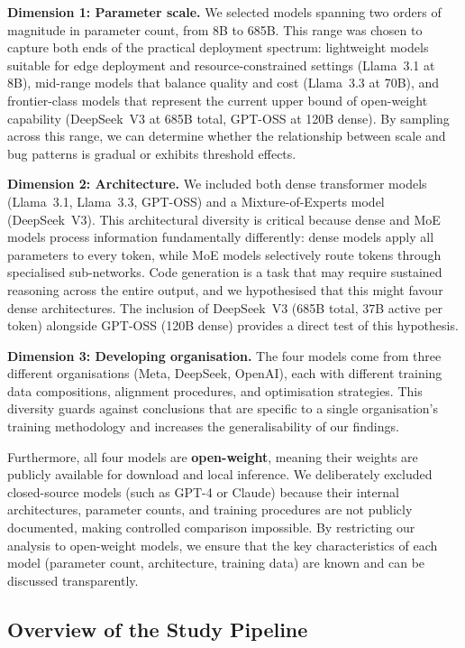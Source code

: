 \documentclass[smallextended]{svjour3}
\begin{document}
\textbf{Dimension 1: Parameter scale.} We selected models spanning two orders of magnitude in parameter count, from 8B to 685B. This range was chosen to capture both ends of the practical deployment spectrum: lightweight models suitable for edge deployment and resource-constrained settings (Llama~3.1 at 8B), mid-range models that balance quality and cost (Llama~3.3 at 70B), and frontier-class models that represent the current upper bound of open-weight capability (DeepSeek~V3 at 685B total, GPT-OSS at 120B dense). By sampling across this range, we can determine whether the relationship between scale and bug patterns is gradual or exhibits threshold effects.

\textbf{Dimension 2: Architecture.} We included both dense transformer models (Llama~3.1, Llama~3.3, GPT-OSS) and a Mixture-of-Experts model (DeepSeek~V3). This architectural diversity is critical because dense and MoE models process information fundamentally differently: dense models apply all parameters to every token, while MoE models selectively route tokens through specialised sub-networks. Code generation is a task that may require sustained reasoning across the entire output, and we hypothesised that this might favour dense architectures. The inclusion of DeepSeek~V3 (685B total, 37B active per token) alongside GPT-OSS (120B dense) provides a direct test of this hypothesis.

\textbf{Dimension 3: Developing organisation.} The four models come from three different organisations (Meta, DeepSeek, OpenAI), each with different training data compositions, alignment procedures, and optimisation strategies. This diversity guards against conclusions that are specific to a single organisation's training methodology and increases the generalisability of our findings.

Furthermore, all four models are \textbf{open-weight}, meaning their weights are publicly available for download and local inference. We deliberately excluded closed-source models (such as GPT-4 or Claude) because their internal architectures, parameter counts, and training procedures are not publicly documented, making controlled comparison impossible. By restricting our analysis to open-weight models, we ensure that the key characteristics of each model (parameter count, architecture, training data) are known and can be discussed transparently.

\subsection{Overview of the Study Pipeline}
\label{sec:overview}
\end{document}
